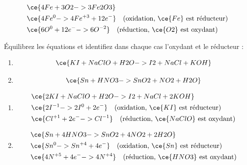 \documentclass[
  11pt,
  a4paper,
  openany]{book}
\providecommand{\tightlist}{%
  \setlength{\itemsep}{0pt}\setlength{\parskip}{0pt}}
\begin{document}
\begin{Answer}
\[
\begin{split}
& \ce{4 Fe + 3 O2 -> 3 Fe2O3} \\
& \ce{ 4 Fe^{0} -> 4 Fe^{+3} + 12 e^-} \quad \text{(oxidation, $\ce{Fe}$ est réducteur)} \\
& \ce{ 6 O^{0} + 12 e^- -> 6 O^{-2}} \quad \text{(réduction, $\ce{O2}$ est oxydant)}
\end{split}
\]

\end{Answer}

\begin{Exercise}

Équilibrez les équations et identifiez dans chaque cas l'oxydant et le réducteur :

\begin{enumerate}
\def\labelenumi{\alph{enumi}.}
\tightlist
\item
  \[
  \ce{ KI + NaClO + H2O -> I2 + NaCl + KOH }
  \]
\item
  \[
  \ce{ Sn + HNO3 -> SnO2 + NO2 + H2O }
  \]
\end{enumerate}

\end{Exercise}

\begin{Answer}

\begin{enumerate}
\def\labelenumi{\alph{enumi}.}
\tightlist
\item
  \[
  \begin{split}
  & \ce{2 KI + NaClO + H2O -> I2 + NaCl + 2 KOH} \\
  & \ce{ 2 I^{-1} -> 2 I^{0} + 2 e^-} \quad \text{(oxidation, $\ce{KI}$ est réducteur)} \\
  & \ce{ Cl^{+1} + 2 e^- -> Cl^{-1}} \quad \text{(réduction, $\ce{NaClO}$ est oxydant)}
  \end{split}
  \]
\item
  \[
  \begin{split}
  & \ce{ Sn + 4 HNO3 -> SnO2 + 4 NO2 + 2 H2O } \\
  & \ce{ Sn^{0} -> Sn^{+4} + 4 e^-} \quad \text{(oxidation, $\ce{Sn}$ est réducteur)} \\
  & \ce{ 4 N^{+5} + 4 e^- -> 4 N^{+4}} \quad \text{(réduction, $\ce{HNO3}$ est oxydant)}
  \end{split}
  \]
\end{enumerate}

\end{Answer}
\end{document}
